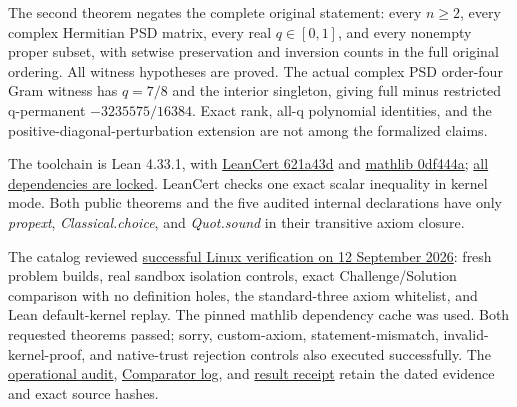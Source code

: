 \documentclass[11pt,a4paper]{article}
\begin{document}
The second theorem negates the complete original statement: every
\(n\ge2\), every complex Hermitian PSD matrix, every real \(q\in[0,1]\),
and every nonempty proper subset, with setwise preservation and
inversion counts in the full original ordering. All witness hypotheses
are proved. The actual complex PSD order-four Gram witness has \(q=7/8\)
and the interior singleton, giving full minus restricted q-permanent
\(-3235575/16384\). Exact rank, all-q polynomial identities, and the
positive-diagonal-perturbation extension are not among the formalized
claims.

The toolchain is Lean 4.33.1, with
\href{https://github.com/alerad/leancert/commit/621a43d7cf21f87872392a01e874f2f1dbddc926}{LeanCert
621a43d} and
\href{https://github.com/leanprover-community/mathlib4/commit/0df444a360eaa60ab8c11dca51a86af692955474}{mathlib
0df444a};
\href{https://github.com/sgstepaniants/OpenProblemsInNLA/blob/cd44ce9bcb84ebc79a1aa934918d1f76b2a9c6e7/matrix-inequalities-and-norms/MI-19/lean/lake-manifest.json}{all
dependencies are locked}. LeanCert checks one exact scalar inequality in
kernel mode. Both public theorems and the five audited internal
declarations have only \textit{propext}, \textit{Classical.choice}, and
\textit{Quot.sound} in their transitive axiom closure.

The catalog reviewed
\href{https://github.com/sgstepaniants/OpenProblemsInNLA/actions/runs/34703363593/job/103578942995}{successful
Linux verification on 12 September 2026}: fresh problem builds, real
sandbox isolation controls, exact Challenge/Solution comparison with no
definition holes, the standard-three axiom whitelist, and Lean
default-kernel replay. The pinned mathlib dependency cache was used.
Both requested theorems passed; sorry, custom-axiom, statement-mismatch,
invalid-kernel-proof, and native-trust rejection controls also executed
successfully. The
\href{https://github.com/ajt60gaibb/OpenProblemsInNLA/blob/main/matrix-inequalities-and-norms/MI-19/lean/verification/linux-2026-09-12/OPERATIONAL-REVIEW.md}{operational
audit},
\href{https://github.com/ajt60gaibb/OpenProblemsInNLA/blob/main/matrix-inequalities-and-norms/MI-19/lean/verification/linux-2026-09-12/artifacts/lean-MI-19/verify-20260912T155027Z-3941/comparator.log}{Comparator
log}, and
\href{https://github.com/ajt60gaibb/OpenProblemsInNLA/blob/main/matrix-inequalities-and-norms/MI-19/lean/verification/linux-2026-09-12/artifacts/lean-MI-19/verify-20260912T155027Z-3941/result.json}{result
receipt} retain the dated evidence and exact source hashes.
\end{document}
